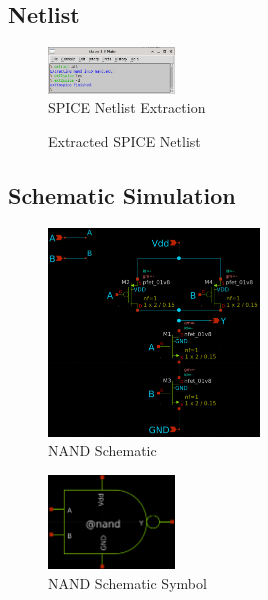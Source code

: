 \documentclass{article}
\begin{document}
	\subsection{Netlist}
	
	\begin{figure}[H]
		\centerline{\includegraphics[width=0.3\textwidth]{nand_netlist_creation.png}}
		\caption{SPICE Netlist Extraction}
		\label{fig::nand_netlist_creation}
	\end{figure}
	
	\begin{figure}[H]
		
		\caption{Extracted SPICE Netlist}
		\label{fig::nand_netlist}
	\end{figure}
	
	\subsection{Schematic Simulation}
	
	\begin{figure}[H]
		\centerline{\includegraphics[width=0.5\textwidth]{nand_schematic.png}}
		\caption{NAND Schematic}
		\label{fig::nand_schematic}
	\end{figure}
	
	\begin{figure}[H]
		\centerline{\includegraphics[width=0.3\textwidth]{nand_symbol.png}}
		\caption{NAND Schematic Symbol}
		\label{fig::nand_symbol}
	\end{figure}
	
\end{document}
